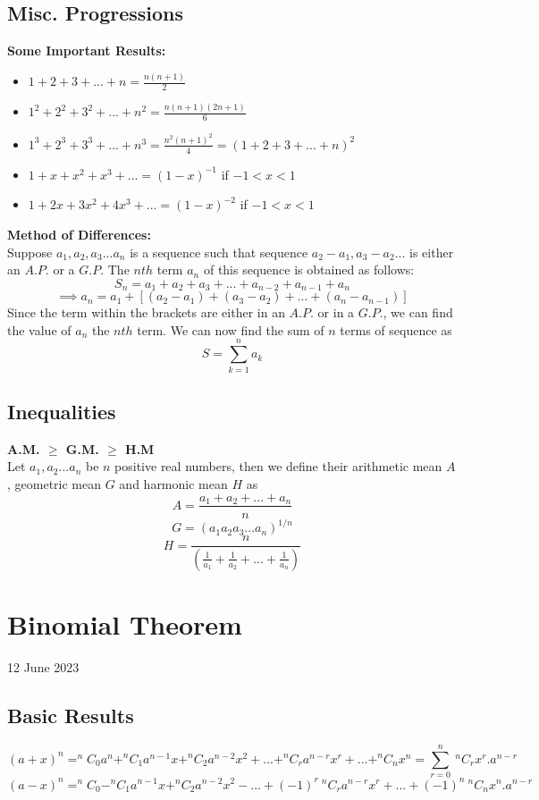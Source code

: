 \documentclass[12pt]{article}
\begin{document}
\subsection{Misc. Progressions}
\textbf{Some Important Results:}
\begin{itemize}
\item $1+2+3+...+n=\frac{n(n+1)}{2}$
\item $1^2+2^2+3^2+...+n^2=\frac{n(n+1)(2n+1)}{6}$
\item $1^3+2^3+3^3+...+n^3=\frac{n^2(n+1)^2}{4}=(1+2+3+...+n)^2$
\item $1+x+x^2+x^3+...=(1-x)^{-1}$ if $-1<x<1$
\item $1+2x+3x^2+4x^3+...=(1-x)^{-2}$ if $-1<x<1$
\end{itemize}
\textbf{Method of Differences:}\\
Suppose $a_1,a_2,a_3...a_n$ is a sequence such that sequence $a_2-a_1,a_3-a_2...$ is either an $A.P.$ or a $G.P.$ The $nth$ term $a_n$ of this sequence is obtained as follows:
$$S_n=a_1+a_2+a_3+...+a_{n-2}+a_{n-1}+a_n$$
$$\implies a_n=a_1+[(a_2-a_1)+(a_3-a_2)+...+(a_n-a_{n-1})]$$
Since the term within the brackets are either in an $A.P.$ or in a $G.P.$, we can find the value of $a_n$ the $nth$ term. We can now find the sum of $n$ terms of sequence as $$S=\sum_{k=1}^{n} a_k$$
\subsection{Inequalities}
\textbf{A.M. $\ge$ G.M. $\ge$ H.M} \\
Let $a_1,a_2...a_n$ be $n$ positive real numbers, then we define their arithmetic mean $A$, geometric mean $G$ and harmonic mean $H$ as 
$$A=\frac{a_1+a_2+...+a_n}{n}$$ $$G=(a_1 a_2 a_3 ... a_n)^{1/n}$$
$$H=\frac{n}{(\frac{1}{a_1}+\frac{1}{a_2}+...+\frac{1}{a_n})}$$
\section{Binomial Theorem}
12 June 2023
\subsection{Basic Results}
$$(a+x)^n=^nC_0a^n+^nC_1a^{n-1}x+^nC_2a^{n-2}x^2+...+^nC_ra^{n-r}x^r+...+^nC_nx^n=\sum_{r=0}^{n} \medspace ^nC_rx^r. a^{n-r} $$
$$(a-x)^n=^nC_0-^nC_1a^{n-1}x+^nC_2a^{n-2}x^2-...+(-1)^r \medspace ^nC_ra^{n-r}x^r+...+(-1)^n \medspace ^nC_nx^n.a^{n-r} $$
\end{document}
